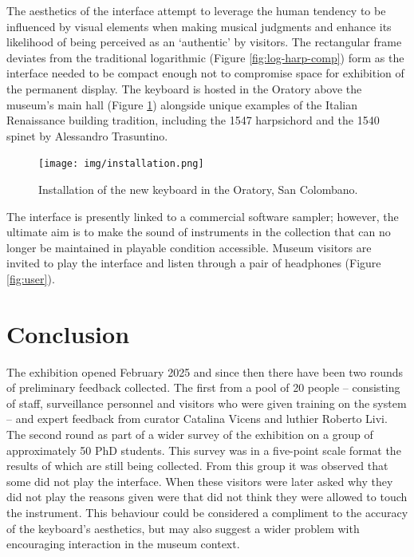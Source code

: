 The aesthetics of the interface attempt to leverage the human tendency to be influenced by visual elements when making musical judgments \cite{tsay_sight_2013, fritz_player_2012,fritz_soloist_2014,fritz_listener_2017} and enhance its likelihood of being perceived as an `authentic' by visitors. The rectangular frame deviates from the traditional logarithmic (Figure \ref{fig:log-harp-comp}) form as the interface needed to be compact enough not to compromise space for exhibition of the permanent display. The keyboard is hosted in the Oratory above the museum's main hall (Figure \ref{fig:installed}) alongside unique examples of the Italian Renaissance building tradition, including the 1547 harpsichord and the 1540 spinet by Alessandro Trasuntino.

\begin{figure}
    \centering
    \texttt{[image: img/installation.png]}
    \caption{Installation of the new keyboard in the Oratory, San Colombano.}
    \label{fig:installed}
\vfill\end{figure}

The interface is presently linked to a commercial software sampler; however, the ultimate aim is to make the sound of instruments in the collection that can no longer be maintained in playable condition accessible. Museum visitors are invited to play the interface and listen through a pair of headphones (Figure \ref{fig:user}).


\section{Conclusion}

The exhibition opened February 2025 and since then there have been two rounds of preliminary feedback collected. The first from a pool of 20 people -- consisting of staff, surveillance personnel and visitors who were given training on the system -- and expert feedback from curator Catalina Vicens and luthier Roberto Livi. The second round as part of a wider survey of the exhibition on a group of approximately 50 PhD students. This survey was in a five-point scale format the results of which are still being collected. From this group it was observed that some did not play the interface. When these visitors were later asked why they did not play the reasons given were that did not think they were allowed to touch the instrument. This behaviour could be considered a compliment to the accuracy of the keyboard's aesthetics, but may also suggest a wider problem with encouraging interaction in the museum context.


